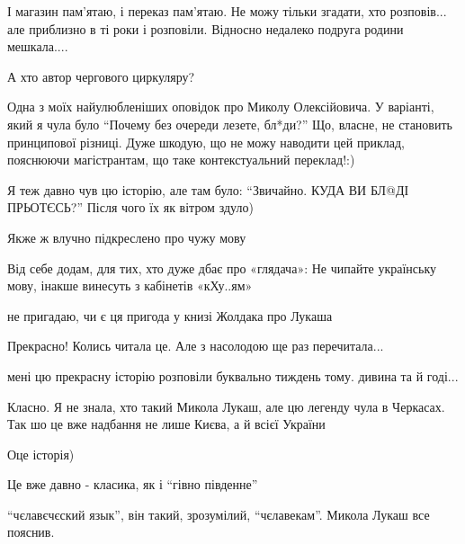 \begin{itemize}

І магазин пам'ятаю, і переказ пам'ятаю. Не можу тільки згадати, хто розповів...
але приблизно в ті роки і розповіли. Відносно недалеко подруга родини
мешкала....


А хто автор чергового циркуляру?


Одна з моїх найулюбленіших оповідок про Миколу Олексійовича. У варіанті, який я
чула було \enquote{Почему без очереди лезете, бл*ди?} Що, власне, не становить
принципової різниці. Дуже шкодую, що не можу наводити цей приклад, пояснюючи
магістрантам, що таке контекстуальний переклад!:)


Я теж давно чув цю історію, але там було: \enquote{Звичайно. КУДА ВИ БЛ@ДІ ПРЬОТЄСЬ?} Після чого їх як вітром здуло)


Якже ж влучно підкреслено про чужу мову

Від себе додам, для тих, хто дуже дбає про «глядача»:
Не чипайте українську мову, інакше винесуть з кабінетів «кХу..ям»


не пригадаю, чи є ця пригода у книзі Жолдака про Лукаша


Прекрасно! Колись читала це. Але з насолодою ще раз перечитала...


мені цю прекрасну історію розповіли буквально тиждень тому. дивина та й годі...


Класно. Я не знала, хто такий Микола Лукаш, але цю легенду чула в Черкасах. Так
шо це вже надбання не лише Києва, а й всієї України


Оце історія)


Це вже давно - класика, як і \enquote{гівно південне}\smile


\enquote{чєлавєчєский язык}, він такий, зрозумілий, \enquote{чєлавекам}. Микола Лукаш все пояснив.


\end{itemize}
